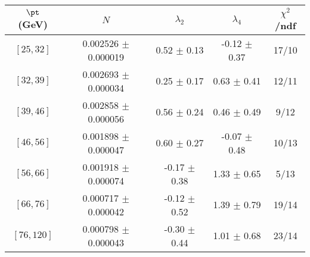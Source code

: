 \begin{tabular}{c||c|c|c|c}
$\pt$ (GeV) & $N$ & $\lambda_{2}$ & $\lambda_4$  & $\chi^2$/ndf  \\
\hline
$[25, 32]$ & 0.002526 $\pm$ 0.000019 & 0.52 $\pm$ 0.13 & -0.12 $\pm$ 0.37 & 17/10\\
$[32, 39]$ & 0.002693 $\pm$ 0.000034 & 0.25 $\pm$ 0.17 & 0.63 $\pm$ 0.41 & 12/11\\
$[39, 46]$ & 0.002858 $\pm$ 0.000056 & 0.56 $\pm$ 0.24 & 0.46 $\pm$ 0.49 & 9/12\\
$[46, 56]$ & 0.001898 $\pm$ 0.000047 & 0.60 $\pm$ 0.27 & -0.07 $\pm$ 0.48 & 10/13\\
$[56, 66]$ & 0.001918 $\pm$ 0.000074 & -0.17 $\pm$ 0.38 & 1.33 $\pm$ 0.65 & 5/13\\
$[66, 76]$ & 0.000717 $\pm$ 0.000042 & -0.12 $\pm$ 0.52 & 1.39 $\pm$ 0.79 & 19/14\\
$[76, 120]$ & 0.000798 $\pm$ 0.000043 & -0.30 $\pm$ 0.44 & 1.01 $\pm$ 0.68 & 23/14\\
\end{tabular}
